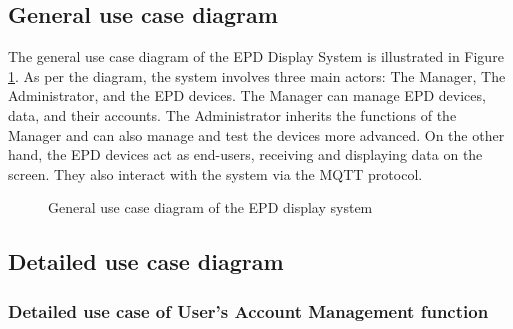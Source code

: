 \documentclass[../Main.tex]{subfiles}
\begin{document}
\subsection{General use case diagram}
\label{subsection:2.2.1}
The general use case diagram of the EPD Display System is illustrated in Figure \ref{fig:uc_general}. As per the diagram, the system involves three main actors: The Manager, The Administrator, and the EPD devices. The Manager can manage EPD devices, data, and their accounts. The Administrator inherits the functions of the Manager and can also manage and test the devices more advanced. On the other hand, the EPD devices act as end-users, receiving and displaying data on the screen. They also interact with the system via the MQTT protocol.
\begin{figure}[htbp]
    \centering
    \caption{General use case diagram of the EPD display system}
    \label{fig:uc_general}
\end{figure}

\subsection{Detailed use case diagram}
\label{subsection:2.2.2}

\subsubsection{Detailed use case of User's Account Management function}
\end{document}
